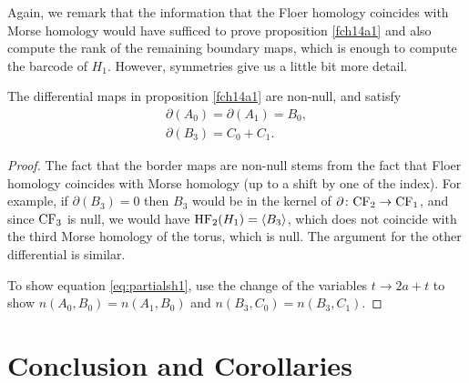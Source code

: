 Again, we remark that the information that the Floer homology coincides with Morse homology would have sufficed to prove proposition \ref{fch14a1} and also compute the rank of the remaining boundary maps, which is enough to compute the barcode of $H_1$. However, symmetries give us a little bit more detail.

\begin{prop}\label{fch14a2}
The differential maps in proposition \ref{fch14a1} are non-null, and satisfy
\begin{equation}\label{eq:partialsh1}
\begin{gathered}
\partial(A_0) = \partial(A_1) = B_0,\\
\partial(B_3) = C_0 + C_1.
\end{gathered}
\end{equation}
\end{prop}

\begin{proof}
The fact that the border maps are non-null stems from the fact that Floer homology coincides with Morse homology (up to a shift by one of the index). For example, if $\partial(B_3) = 0$ then $B_3$ would be in the kernel of $\partial \colon \mathrm{CF}_2 \to \mathrm{CF}_1$, and since $\mathrm{CF}_3$ is null, we would have $\mathrm{HF}_2(H_1) = \langle B_3\rangle$, which does not coincide with the third Morse homology of the torus, which is null. The argument for the other differential is similar.

To show equation \eqref{eq:partialsh1}, use the change of the variables $t \to 2a + t$ to show $n(A_0,B_0) = n(A_1,B_0)$ and $n(B_3,C_0) = n(B_3,C_1)$.
\end{proof}

\section{Conclusion and Corollaries}


